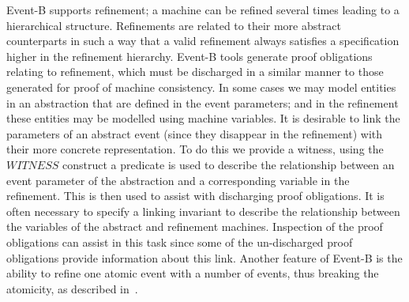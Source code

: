 Event-B supports refinement; a machine can be refined several times leading to a hierarchical structure. Refinements are related to their more abstract counterparts in such a way that a valid refinement always satisfies a specification higher in the refinement hierarchy. Event-B tools generate proof obligations relating to refinement, which must be discharged in a similar manner to those generated for proof of machine consistency. In some cases we may model entities in an abstraction that are defined in the event parameters; and in the refinement these entities may be modelled using machine variables. It is desirable to link the parameters of an abstract event (since they disappear in the refinement) with their more concrete representation. To do this we provide a witness, using the $WITNESS$ construct a predicate is used to describe the relationship between an event parameter of the abstraction and a corresponding variable in the refinement. This is then used to assist with discharging proof obligations. It is often necessary to specify a linking invariant to describe the relationship between the variables of the abstract and refinement machines. Inspection of the proof obligations can assist in this task since some of the un-discharged proof obligations provide information about this link. Another feature of Event-B is the ability to  refine one atomic event with a number of events, thus breaking the atomicity, as described in~\cite{Butler08}. 

